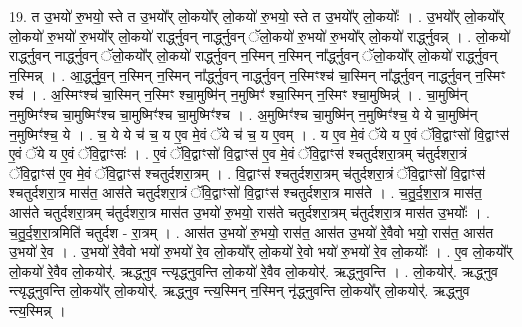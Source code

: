 \documentclass[17pt]{extarticle}
\begin{document}
19. त उ॒भयो॑ रु॒भयो॒ स्ते त उ॒भयो᳚र् लो॒कयो᳚र् लो॒कयो॑ रु॒भयो॒ स्ते त उ॒भयो᳚र् लो॒कयोः᳚ । . उ॒भयो᳚र् लो॒कयो᳚र् लो॒कयो॑ रु॒भयो॑ रु॒भयो᳚र् लो॒कयो॑ रार्द्ध्नुवन् नार्द्ध्नुवन् ॅलो॒कयो॑ रु॒भयो॑ रु॒भयो᳚र् लो॒कयो॑ रार्द्ध्नुवन्न् । . लो॒कयो॑ रार्द्ध्नुवन् नार्द्ध्नुवन् ॅलो॒कयो᳚र् लो॒कयो॑ रार्द्ध्नुवन् न॒स्मिन् न॒स्मिन् ना᳚र्द्ध्नुवन् ॅलो॒कयो᳚र् लो॒कयो॑ रार्द्ध्नुवन् न॒स्मिन्न् । . आ॒र्द्ध्नु॒व॒न् न॒स्मिन् न॒स्मिन् ना᳚र्द्ध्नुवन् नार्द्ध्नुवन् न॒स्मिꣳश्च॑ चा॒स्मिन् ना᳚र्द्ध्नुवन् नार्द्ध्नुवन् न॒स्मिꣳ श्च॑ । . अ॒स्मिꣳश्च॑ चा॒स्मिन् न॒स्मिꣳ श्चा॒मुष्मि॑न् न॒मुष्मिꣳ॑ श्चा॒स्मिन् न॒स्मिꣳ
श्चा॒मुष्मिन्न्॑ । . चा॒मुष्मि॑न् न॒मुष्मिꣳ॑श्च चा॒मुष्मिꣳ॑श्च चा॒मुष्मिꣳ॑श्च चा॒मुष्मिꣳ॑श्च । . अ॒मुष्मिꣳ॑श्च चा॒मुष्मि॑न् न॒मुष्मिꣳ॑श्च॒ ये ये चा॒मुष्मि॑न् न॒मुष्मिꣳ॑श्च॒ ये । . च॒ ये ये च॑ च॒ य ए॒व मे॒वं ॅये च॑ च॒ य ए॒वम् । . य ए॒व मे॒वं ॅये य ए॒वं ॅवि॒द्वाꣳसो॑ वि॒द्वाꣳस॑ ए॒वं ॅये य ए॒वं ॅवि॒द्वाꣳसः॑ । . ए॒वं ॅवि॒द्वाꣳसो॑ वि॒द्वाꣳस॑ ए॒व मे॒वं ॅवि॒द्वाꣳस॑ श्चतुर्दशरा॒त्रम् च॑तुर्दशरा॒त्रं ॅवि॒द्वाꣳस॑ ए॒व मे॒वं ॅवि॒द्वाꣳस॑ श्चतुर्दशरा॒त्रम् । . वि॒द्वाꣳस॑ श्चतुर्दशरा॒त्रम् च॑तुर्दशरा॒त्रं ॅवि॒द्वाꣳसो॑ वि॒द्वाꣳस॑ श्चतुर्दशरा॒त्र मास॑त॒ आस॑ते चतुर्दशरा॒त्रं ॅवि॒द्वाꣳसो॑ वि॒द्वाꣳस॑ श्चतुर्दशरा॒त्र मास॑ते । . च॒तु॒र्द॒श॒रा॒त्र मास॑त॒ आस॑ते चतुर्दशरा॒त्रम् च॑तुर्दशरा॒त्र मास॑त उ॒भयो॑ रु॒भयो॒ रास॑ते चतुर्दशरा॒त्रम् च॑तुर्दशरा॒त्र मास॑त उ॒भयोः᳚ । . च॒तु॒र्द॒श॒रा॒त्रमिति॑ चतुर्दश - रा॒त्रम् । . आस॑त उ॒भयो॑ रु॒भयो॒ रास॑त॒ आस॑त उ॒भयो॑ रे॒वैवो भयो॒ रास॑त॒ आस॑त उ॒भयो॑ रे॒व । . उ॒भयो॑ रे॒वैवो भयो॑ रु॒भयो॑ रे॒व लो॒कयो᳚र् लो॒कयो॑ रे॒वो भयो॑ रु॒भयो॑ रे॒व लो॒कयोः᳚ । . ए॒व लो॒कयो᳚र् लो॒कयो॑ रे॒वैव लो॒कयोर्॑. ऋद्ध्नुव न्त्यृद्ध्नुवन्ति लो॒कयो॑ रे॒वैव लो॒कयोर्॑. ऋद्ध्नुवन्ति । . लो॒कयोर्॑. ऋद्ध्नुव न्त्यृद्ध्नुवन्ति लो॒कयो᳚र् लो॒कयोर्॑. ऋद्ध्नुव न्त्य॒स्मिन् न॒स्मिन् नृ॑द्ध्नुवन्ति लो॒कयो᳚र् लो॒कयोर्॑. ऋद्ध्नुव न्त्य॒स्मिन्न् । \newline
\end{document}

